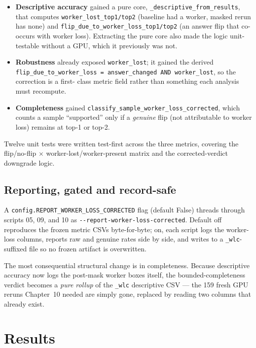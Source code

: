 \begin{itemize}
  \item \textbf{Descriptive accuracy} gained a pure core, \texttt{\_descriptive\_from\_results}, that
  computes \texttt{worker\_lost\_top1/top2} (baseline had a worker, masked rerun has none) and
  \texttt{flip\_due\_to\_worker\_loss\_top1/top2} (an answer flip that co-occurs with worker loss).
  Extracting the pure core also made the logic unit-testable without a GPU, which it previously was
  not.
  \item \textbf{Robustness} already exposed \texttt{worker\_lost}; it gained the derived
  \texttt{flip\_due\_to\_worker\_loss = answer\_changed AND worker\_lost}, so the correction is a first-
  class metric field rather than something each analysis must recompute.
  \item \textbf{Completeness} gained \texttt{classify\_sample\_worker\_loss\_corrected}, which counts a
  sample ``supported'' only if a \emph{genuine} flip (not attributable to worker loss) remains at
  top-1 or top-2.
\end{itemize}

Twelve unit tests were written test-first across the three metrics, covering the flip/no-flip $\times$
worker-lost/worker-present matrix and the corrected-verdict downgrade logic.

\subsection{Reporting, gated and record-safe}

A \texttt{config.REPORT\_WORKER\_LOSS\_CORRECTED} flag (default False) threads through scripts 05, 09,
and 10 as \texttt{-{}-report-worker-loss-corrected}. Default off reproduces the frozen metric CSVs
byte-for-byte; on, each script logs the worker-loss columns, reports raw and genuine rates side by
side, and writes to a \texttt{\_wlc}-suffixed file so no frozen artifact is overwritten.

The most consequential structural change is in completeness. Because descriptive accuracy now logs the
post-mask worker boxes itself, the bounded-completeness verdict becomes a \emph{pure rollup} of the
\texttt{\_wlc} descriptive CSV --- the 159 fresh GPU reruns Chapter~10 needed are simply gone,
replaced by reading two columns that already exist.

\section{Results}


